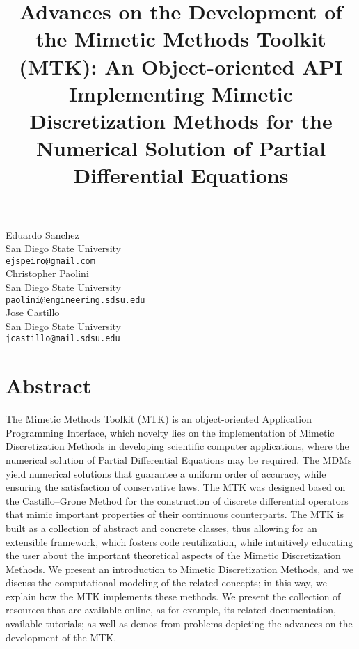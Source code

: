 \documentclass[article,A4,11pt]{llncs}%
\begin{document}
\title{Advances on the Development of the Mimetic Methods Toolkit (MTK): An Object-oriented API Implementing Mimetic Discretization Methods for the Numerical Solution of Partial Differential Equations}
 \author{} \institute{}
\maketitle
\begin{center}
{\large \underline{Eduardo Sanchez}}\\
San Diego State University\\
{\tt ejspeiro@gmail.com}
\\ \vspace{4mm}
{\large Christopher Paolini}\\
San Diego State University\\
{\tt paolini@engineering.sdsu.edu}
\\ \vspace{4mm}
{\large Jose Castillo}\\
San Diego State University\\
{\tt jcastillo@mail.sdsu.edu}
\end{center}

\section*{Abstract}
The  Mimetic Methods Toolkit (MTK) is an object-oriented Application Programming Interface, which novelty lies on the implementation of Mimetic Discretization Methods in developing scientific computer applications, where the numerical solution of Partial Differential Equations may be required. The MDMs yield numerical solutions that guarantee a uniform order of accuracy, while ensuring the satisfaction of conservative laws. The MTK was designed based on the Castillo–Grone Method for the construction of discrete differential operators that mimic important properties of their continuous counterparts. The MTK is built as a collection of abstract and concrete classes, thus allowing for an extensible framework, which fosters code reutilization, while intuitively educating the user about the important theoretical aspects of the Mimetic Discretization Methods. We present an introduction to Mimetic Discretization Methods, and we discuss the computational modeling of the related concepts; in this way, we explain how the MTK implements these methods. We present the collection of resources that are available online, as for example, its related documentation, available tutorials; as well as demos from problems depicting the advances on the development of the MTK.
\end{document}

